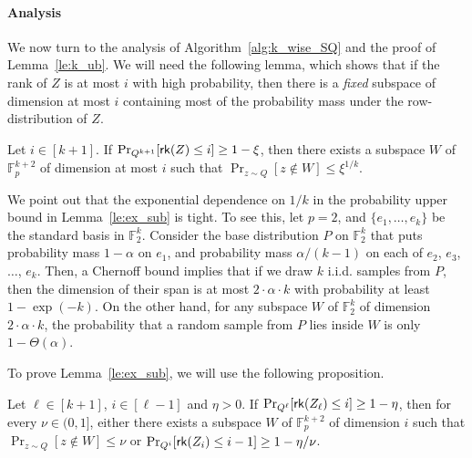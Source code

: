
\paragraph{Analysis}
We now turn to the analysis of Algorithm~\ref{alg:k_wise_SQ} and the proof of Lemma~\ref{le:k_ub}. We will need the following lemma, which shows that if the rank of $Z$ is at most $i$ with high probability, then there is a \emph{fixed} subspace of dimension at most $i$ containing most of the probability mass under the row-distribution of $Z$.
\begin{lem}\label{le:ex_sub}
Let $i \in [k+1]$. If $\Pr_{Q^{k+1}}[\mathsf{rk}(Z) \le i] \geq 1-\xi$, then there exists a subspace $W$ of $\mathbb{F}_p^{k+2}$ of dimension at most $i$ such that $\Pr_{z \sim Q}[z \notin W] \le \xi^{1/k}$.
\end{lem}

\begin{remark}
We point out that the exponential dependence on $1/k$ in the probability upper bound in Lemma~\ref{le:ex_sub} is tight. To see this, let $p = 2$, and $\{e_1, \dots , e_k\}$ be the standard basis in $\mathbb{F}_2^k$. Consider the base distribution $P$ on $\mathbb{F}_2^k$ that puts probability mass $1-\alpha$ on $e_1$, and probability mass $\alpha/(k-1)$ on each of $e_2$, $e_3$, $\dots$, $e_k$. Then, a Chernoff bound implies that if we draw $k$ i.i.d. samples from $P$, then the dimension of their span is at most $2 \cdot \alpha \cdot k$ with probability at least $1 - \exp(-k)$. On the other hand, for any subspace $W$ of $\mathbb{F}_2^k$ of dimension $2 \cdot \alpha \cdot k$, the probability that a random sample from $P$ lies inside $W$ is only $1- \Theta(\alpha)$.
\end{remark}

To prove Lemma~\ref{le:ex_sub}, we will use the following proposition.
\begin{proposition}\label{prop:ind}
Let $\ell \in [k+1]$, $i \in [\ell-1]$ and $\eta >0$. If $\Pr_{Q^{\ell}}[\mathsf{rk}(Z_{\ell}) \le i] \geq 1-\eta$, then for every $\nu \in (0,1]$, either there exists a subspace $W$ of $\mathbb{F}_p^{k+2}$ of dimension $i$ such that $\Pr_{z \sim Q}[z \notin W] \le \nu$ or $\Pr_{Q^i}[\mathsf{rk}(Z_{i}) \le i-1] \geq 1-\eta/\nu$.
\end{proposition}

